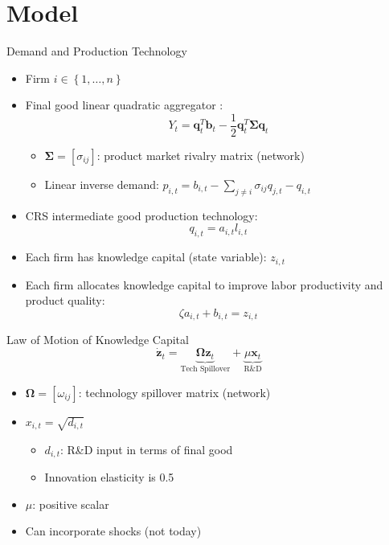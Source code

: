 \documentclass[
  10pt,               %
  aspectratio=169,     %
]{beamer}
\theoremstyle{plain}
\begin{document}
\section{Model}
\begin{frame}{Demand and Production Technology}

  \begin{itemize}
    \item Firm $i\in \left\{1,\ldots, n\right\}$ \medskip{}\pause
    \item Final good linear quadratic aggregator \citep{Pellegrino2024-dn}:
          \[Y_{t}=\bm{q}_{t}^{T}\bm{b}_{t}-\frac{1}{2}\bm{q}_{t}^{T}\bm{\Sigma}\bm{q}_{t}\]\vspace{-1em}
          \begin{itemize}
            \item $\bm{\Sigma}=\left[\sigma_{ij}\right]$: product market rivalry matrix (network)
            \item Linear inverse demand: $p_{i,t}=b_{i,t}-\sum_{j\neq i}\sigma_{ij}q_{j,t} - q_{i,t}$
          \end{itemize}\medskip{}\pause
    \item CRS intermediate good production technology: \[q_{i,t}=a_{i,t}l_{i,t}\]\vspace{-1em}\pause
    \item Each firm has knowledge capital (state variable): $z_{i,t}$ \medskip{}\pause
    \item Each firm allocates knowledge capital to improve labor productivity
          and product quality:
          \[\zeta a_{i,t}+b_{i,t}=z_{i,t}\]
  \end{itemize}
\end{frame}
%
\begin{frame}{Law of Motion of Knowledge Capital}
  \[
    \dot{\bm{z}}_{t}=\underbrace{\bm{\Omega}\bm{z}_{t}}_{\text{Tech Spillover}}+\underbrace{\mu\bm{x}_{t}}_{\text{R\&D}}
  \]
  \begin{itemize}
    \item $\bm{\Omega}=\left[\omega_{ij}\right]$: technology spillover matrix (network)\medskip{}
    \item $x_{i,t}=\sqrt{d_{i,t}}$
          \begin{itemize}
            \item $d_{i,t}$: R\&D input in terms of final good
            \item Innovation elasticity is 0.5\medskip{}
          \end{itemize}
    \item $\mu$: positive scalar
          \medskip{}
    \item Can incorporate shocks (not today)
  \end{itemize}
\end{frame}
\end{document}
